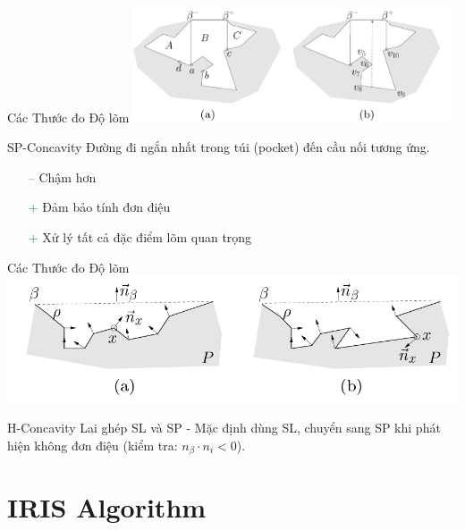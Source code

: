 \documentclass[aspectratio=169]{beamer}
\begin{document}
\begin{frame}{Các Thước đo Độ lõm}
    \centering
    \includegraphics[width=0.7\textwidth]{../imgs/sp_concavity.png}

    \begin{block}{SP-Concavity}
        Đường đi ngắn nhất trong túi (pocket) đến cầu nối tương ứng.
        \begin{itemize}
            \item[\textcolor{red}{--}] Chậm hơn
            \item[\textcolor{teal}{+}] Đảm bảo tính đơn điệu
            \item[\textcolor{teal}{+}] Xử lý tất cả đặc điểm lõm quan trọng
        \end{itemize}
    \end{block}

\end{frame}

\begin{frame}{Các Thước đo Độ lõm}
    \centering
    \includegraphics[width=0.7\linewidth]{../imgs/ACD-6.png}
    \begin{alertblock}{H-Concavity}
        Lai ghép SL và SP - Mặc định dùng SL, chuyển sang SP khi phát hiện không đơn điệu (kiểm tra: $n_\beta \cdot n_i < 0$).
    \end{alertblock}

\end{frame}

\section{IRIS Algorithm}
\end{document}
